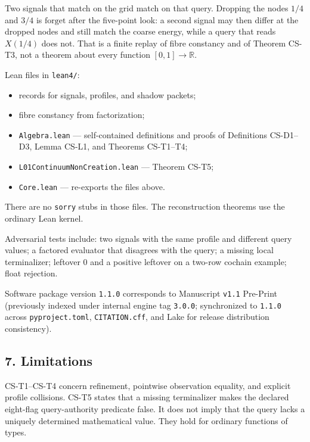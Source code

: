 \documentclass[
  11pt,
]{article}
\providecommand{\tightlist}{%
  \setlength{\itemsep}{0pt}\setlength{\parskip}{0pt}}
\begin{document}
Two signals that match on the grid match on that query. Dropping the nodes \(1/4\) and \(3/4\) is \(\mathrm{forget}\) after the five-point look: a second signal may then differ at the dropped nodes and still match the coarse energy, while a query that reads \(X(1/4)\) does not. That is a finite replay of fibre constancy and of Theorem CS-T3, not a theorem about every function \([0,1]\to\mathbb{R}\).

Lean files in \texttt{lean4/}:

\begin{itemize}
\tightlist
\item
  records for signals, profiles, and shadow packets;
\item
  fibre constancy from factorization;
\item
  \nolinkurl{Algebra.lean} --- self-contained definitions and proofs of Definitions CS-D1--D3, Lemma CS-L1, and Theorems CS-T1--T4;
\item
  \nolinkurl{L01ContinuumNonCreation.lean} --- Theorem CS-T5;
\item
  \texttt{Core.lean} --- re-exports the files above.
\end{itemize}

There are no \texttt{sorry} stubs in those files. The reconstruction theorems use the ordinary Lean kernel.

Adversarial tests include: two signals with the same profile and different query values; a factored evaluator that disagrees with the query; a missing local terminalizer; leftover \(0\) and a positive leftover on a two-row cochain example; float rejection.

Software package version \texttt{1.1.0} corresponds to Manuscript \texttt{v1.1} Pre-Print (previously indexed under internal engine tag \texttt{3.0.0}; synchronized to \texttt{1.1.0} across \texttt{pyproject.toml}, \texttt{CITATION.cff}, and Lake for release distribution consistency).

\subsection{7. Limitations}\label{limitations}

CS-T1--CS-T4 concern refinement, pointwise observation equality, and explicit profile collisions. CS-T5 states that a missing terminalizer makes the declared eight-flag query-authority predicate false. It does not imply that the query lacks a uniquely determined mathematical value. They hold for ordinary functions of types.
\end{document}
